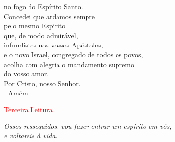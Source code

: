 \documentclass{book}
\begin{document}
\begin{flushleft}
    no fogo do Espírito Santo. \\
    Concedei que ardamos sempre \\
    pelo mesmo Espírito \\
    que, de modo admirável, \\
    infundistes nos vossos Apóstolos, \\
    e o novo Israel, congregado de todos os povos, \\
    acolha com alegria o mandamento supremo \\
    do vosso amor. \\
    Por Cristo, nosso Senhor. \\
    {\color{red} \Rbar.} Amém.
    \vspace{.2cm} \\

\end{flushleft}

\begin{center}

    \textcolor{red}{Terceira Leitura}

\end{center}

\begin{flushright}
    \textit{Ossos ressequidos, vou fazer entrar um espírito em vós, \\ e voltareis à vida.}
\end{flushright}
\end{document}
